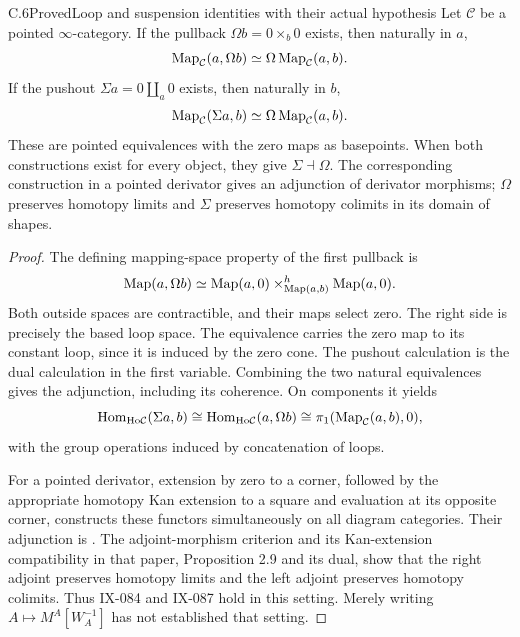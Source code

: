 \begin{result}{C.6}{Proved}{Loop and suspension identities with their actual hypothesis}
Let $\mathcal C$ be a pointed $\infty$-category. If the pullback $\Omega b=0\times_b0$ exists, then naturally in $a$,
\[
 \operatorname{Map}_{\mathcal C}(a,\Omega b)\simeq
       \Omega\operatorname{Map}_{\mathcal C}(a,b).
\]
If the pushout $\Sigma a=0\amalg_a0$ exists, then naturally in $b$,
\[
 \operatorname{Map}_{\mathcal C}(\Sigma a,b)\simeq
       \Omega\operatorname{Map}_{\mathcal C}(a,b).
\]
These are pointed equivalences with the zero maps as basepoints. When both constructions exist for every object, they give $\Sigma\dashv\Omega$. The corresponding construction in a pointed derivator gives an adjunction of derivator morphisms; $\Omega$ preserves homotopy limits and $\Sigma$ preserves homotopy colimits in its domain of shapes.
\end{result}
\begin{proof}
The defining mapping-space property of the first pullback is
\[
 \operatorname{Map}(a,\Omega b)\simeq
 \operatorname{Map}(a,0)\times^h_{\operatorname{Map}(a,b)}\operatorname{Map}(a,0).
\]
Both outside spaces are contractible, and their maps select zero. The right side is precisely the based loop space. The equivalence carries the zero map to its constant loop, since it is induced by the zero cone. The pushout calculation is the dual calculation in the first variable. Combining the two natural equivalences gives the adjunction, including its coherence. On components it yields
\[
 \operatorname{Hom}_{\mathrm{Ho}\mathcal C}(\Sigma a,b)
 \cong\operatorname{Hom}_{\mathrm{Ho}\mathcal C}(a,\Omega b)
 \cong\pi_1(\operatorname{Map}_{\mathcal C}(a,b),0),
\]
with the group operations induced by concatenation of loops.

For a pointed derivator, extension by zero to a corner, followed by the appropriate homotopy Kan extension to a square and evaluation at its opposite corner, constructs these functors simultaneously on all diagram categories. Their adjunction is \citet[Definition 3.16 and Proposition 3.17]{Groth2013}. The adjoint-morphism criterion and its Kan-extension compatibility in that paper, Proposition 2.9 and its dual, show that the right adjoint preserves homotopy limits and the left adjoint preserves homotopy colimits. Thus IX-084 and IX-087 hold in this setting. Merely writing $A\mapsto M^A[W_A^{-1}]$ has not established that setting.
\end{proof}

